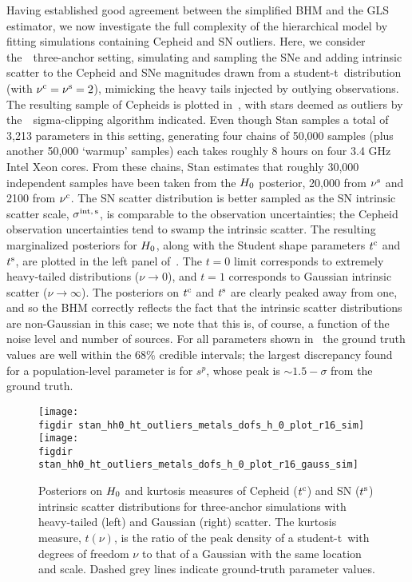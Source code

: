 \documentclass[a4paper,fleqn,usenatbib]{mnras}
\newcommand{\riess}{\citetalias{Riess_etal:2016}}
\newcommand{\tpeak}{t}
\newcommand{\studentdist}{student-t}
\newcommand{\slopep}{\ensuremath{s^p}}
\newcommand{\sigints}{\ensuremath{\sigma^{\rm int,\,s}}}
\newcommand{\dofc}{\ensuremath{\nu^{\rm c}}}
\newcommand{\dofs}{\ensuremath{\nu^{\rm s}}}
\newcommand{\tpeakc}{\ensuremath{\tpeak^{\rm c}}}
\newcommand{\tpeaks}{\ensuremath{\tpeak^{\rm s}}}
\begin{document}
{Having established good agreement between the simplified BHM and the GLS estimator, we now investigate the full complexity of the hierarchical model by fitting simulations containing Cepheid and SN outliers. Here, we consider the~\riess\ three-anchor setting, simulating and sampling the SNe and adding intrinsic scatter to the Cepheid and SNe magnitudes drawn from a \studentdist\ distribution (with $\dofc=\dofs=2$), mimicking the heavy tails injected by outlying observations. The resulting sample of Cepheids is plotted in~, with stars deemed as outliers by the~\riess\ sigma-clipping algorithm indicated. Even though Stan samples a total of 3,213 parameters in this setting, generating four chains of 50,000 samples (plus another 50,000 `warmup' samples) each takes roughly 8 hours on four 3.4 GHz Intel Xeon cores. From these chains, Stan estimates that roughly 30,000 independent samples have been taken from the $H_0$ posterior, 20,000 from $\dofs$ and 2100 from $\dofc$. The SN scatter distribution is better sampled as the SN intrinsic scatter scale, $\sigints$, is comparable to the observation uncertainties; the Cepheid observation uncertainties tend to swamp the intrinsic scatter. The resulting marginalized posteriors for $H_0$, along with the Student shape parameters $\tpeakc$ and $\tpeaks$, are plotted in the left panel of~. The $\tpeak=0$ limit corresponds to extremely heavy-tailed distributions ($\nu \rightarrow 0$), and $\tpeak=1$ corresponds to Gaussian intrinsic scatter ($\nu \rightarrow \infty$). The posteriors on $\tpeakc$ and $\tpeaks$ are clearly peaked away from one, and so the BHM correctly reflects the fact that the intrinsic scatter distributions are non-Gaussian in this case; we note that this is, of course, a function of the noise level and number of sources. For all parameters shown in~ the ground truth values are well within the 68\% credible intervals; the largest discrepancy found for a population-level parameter is for $\slopep$, whose peak is $\sim1.5-\sigma$ from the ground truth.

\begin{figure*}
\texttt{[image: \\figdir stan\_hh0\_ht\_outliers\_metals\_dofs\_h\_0\_plot\_r16\_sim]}
\texttt{[image: \\figdir stan\_hh0\_ht\_outliers\_metals\_dofs\_h\_0\_plot\_r16\_gauss\_sim]}
\caption{Posteriors on $H_0$ and kurtosis measures of Cepheid ($\tpeakc$) and SN ($\tpeaks$) intrinsic scatter distributions for three-anchor simulations with heavy-tailed (left) and Gaussian (right) scatter. The kurtosis measure, $\tpeak(\nu)$, is the ratio of the peak density of a \studentdist\ with degrees of freedom $\nu$ to that of a Gaussian with the same location and scale. Dashed grey lines indicate ground-truth parameter values.}
\label{figure:ht_triangle_sim}
\end{figure*}

}
\end{document}
